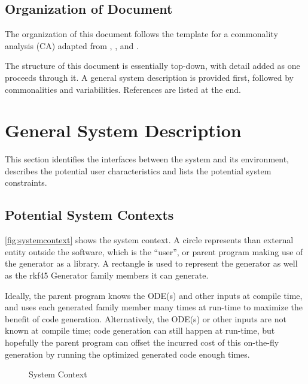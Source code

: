 \documentclass[12pt]{article}
\newcommand{\famname}{rkf45 Generator} %
\begin{document}
\subsection{Organization of Document}
The organization of this document follows the template for a commonality 
analysis (CA)   adapted from 
\cite{Lai2004}, \cite{SmithAndLai2005}, \cite{Smith2006} and 
\cite{SmithEtAl2007}.

The structure of this document is essentially top-down, with detail added as 
one proceeds through it. A general system description is provided first, 
followed by commonalities and variabilities. References are listed at the end.

\section{General System Description}

This section identifies the interfaces between the system and its environment,
describes the potential user characteristics and lists the potential system
constraints.

\subsection{Potential System Contexts}

\autoref{fig:systemcontext} shows the system context. A circle represents than 
external entity outside the software, which is the ``user'', or parent program 
making use of the generator as a library. A rectangle is used to represent the 
generator as well as the \famname{} family members it can generate. 

Ideally, 
the parent program knows the ODE(s) and other inputs at compile time, and
uses each generated family member many times at run-time to maximize the 
benefit of code generation. 
Alternatively, the ODE(s) or other inputs are 
not known at compile time; code generation can still happen at run-time, but 
hopefully the parent program can offset the incurred cost of this on-the-fly 
generation by running the optimized generated code enough times.

\begin{figure}[ht]
    \centering
{}
\caption{System Context}
\label{fig:systemcontext}
\end{figure}
\end{document}
